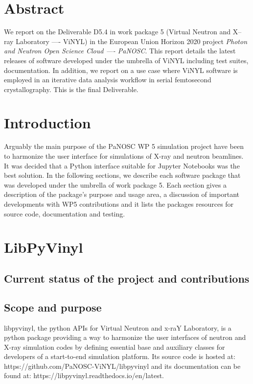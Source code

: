 \documentclass[11pt, a4paper]{article}
\begin{document}
\newpage
{}
\newpage
\tableofcontents
\newpage

\section{Abstract}
We report on the Deliverable D5.4 in work package 5 (Virtual Neutron and X--ray
Laboratory ---- ViNYL) in the European Union Horizon 2020 project \emph{Photon
  and Neutron Open Science Cloud ---- PaNOSC}. 
This report details the latest releases of  software developed under the umbrella of
ViNYL including test suites, documentation. In addition, we report on a use case
where ViNYL software is employed in an iterative data analysis workflow in serial
femtosecond crystallography. This is the final Deliverable.

\section{Introduction}

Arguably the main purpose of the PaNOSC WP 5 simulation project have been to
harmonize the user interface for simulations of X-ray and neutron beamlines. It
was decided that a Python interface suitable for Jupyter Notebooks was the best
solution. In the following sections, we describe each software package that was
developed under the umbrella of work package 5. Each section gives a description
of the package's purpose and usage area, a discussion of important developments
with WP5 contributions and it lists the packages resources for source code,
documentation and testing.

\section{LibPyVinyl\label{sec:libpyvinyl}}

\subsection{Current status of the project and contributions}
\label{sec:lpv_status}

\subsection{Scope and purpose}
\label{sec:lpv_scope}
libpyvinyl, the python APIs for Virtual Neutron and x-raY Laboratory, is a python package providing a way to harmonize the user interfaces of neutron and X-ray simulation codes by defining essential base and auxiliary classes for developers of a start-to-end simulation platform. Its source code is hosted at: https://github.com/PaNOSC-ViNYL/libpyvinyl and its documentation can be found at: https://libpyvinyl.readthedocs.io/en/latest.
\end{document}
